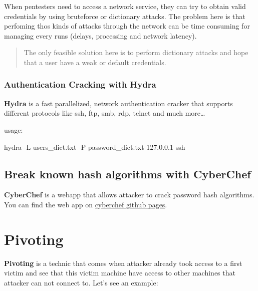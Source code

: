 \documentclass{assets/ipesethesis}
\newenvironment{Shaded}{\begin{snugshade}}{\end{snugshade}}
\newcommand{\ExtensionTok}[1]{#1}
\newcommand{\NormalTok}[1]{#1}
\begin{document}
When pentesters need to access a network service, they can try to obtain valid credentials by using bruteforce or dictionary attacks.
The problem here is that perfoming thos kinds of attacks through the network can be time consuming for managing every runs (delays, processing and network latency).

\begin{quote}
The only feasible solution here is to perform dictionary attacks and hope that a user have a weak or default credentials.
\end{quote}

\hypertarget{authentication-cracking-with-hydra}{%
\subsection*{Authentication Cracking with Hydra}\label{authentication-cracking-with-hydra}}

\textbf{Hydra} is a fast parallelized, network authentication cracker that supports different protocols like ssh, ftp, smb, rdp, telnet and much more\ldots{}

usage:

\begin{Shaded}
\begin{Highlighting}[]
\ExtensionTok{hydra}\NormalTok{ -L users_dict.txt -P password_dict.txt 127.0.0.1 ssh}
\end{Highlighting}
\end{Shaded}

\hypertarget{break-known-hash-algorithms-with-cyberchef}{%
\section*{Break known hash algorithms with CyberChef}\label{break-known-hash-algorithms-with-cyberchef}}

\textbf{CyberChef} is a webapp that allows attacker to crack password hash algorithms. You can find the web app on \href{https://gchq.github.io/CyberChef/}{cyberchef github pages}.

\hypertarget{pivoting}{%
\chapter*{Pivoting}\label{pivoting}}

\textbf{Pivoting} is a technic that comes when attacker already took access to a first victim and see that this victim machine have access to other machines that attacker can
not connect to. Let's see an example:
\end{document}
